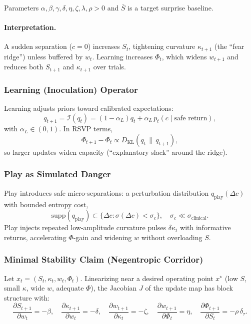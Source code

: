 \documentclass{article}
\theoremstyle{definition}
\begin{document}
Parameters $\alpha,\beta,\gamma,\delta,\eta,\zeta,\lambda,\rho > 0$ and $\bar S$ is a target surprise baseline.

\paragraph{Interpretation.} A sudden separation ($c=0$) increases $S_t$, tightening curvature $\kappa_{t+1}$ (the ``fear ridge'') unless buffered by $w_t$. Learning increases $\Phi_t$, which widens $w_{t+1}$ and reduces both $S_{t+1}$ and $\kappa_{t+1}$ over trials.

\subsubsection{Learning (Inoculation) Operator}

Learning adjusts priors toward calibrated expectations:
\[
q_{t+1} = \mathcal{I}(q_t) = (1-\alpha_L) q_t + \alpha_L \, p_t(c \mid \text{safe return}),
\]
with $\alpha_L \in (0,1)$. In RSVP terms,
\[
\Phi_{t+1} - \Phi_t \propto D_{\mathrm{KL}}(q_t \,\|\, q_{t+1}),
\]
so larger updates widen capacity (``explanatory slack'' around the ridge).

\subsubsection{Play as Simulated Danger}

Play introduces safe micro-separations: a perturbation distribution $q_{\mathrm{play}}(\Delta c)$ with bounded entropy cost,
\[
\mathrm{supp}(q_{\mathrm{play}}) \subset \{\Delta c : \sigma(\Delta c) < \sigma_c\}, \quad \sigma_c \ll \sigma_{\mathrm{clinical}}.
\]
Play injects repeated low-amplitude curvature pulses $\delta \kappa_t$ with informative returns, accelerating $\Phi$-gain and widening $w$ without overloading $S$.

\subsubsection{Minimal Stability Claim (Negentropic Corridor)}

Let $x_t = (S_t, \kappa_t, w_t, \Phi_t)$. Linearizing near a desired operating point $x^\star$ (low $S$, small $\kappa$, wide $w$, adequate $\Phi$), the Jacobian $J$ of the update map has block structure with:
\[
\frac{\partial S_{t+1}}{\partial w_t} = -\beta, \quad
\frac{\partial \kappa_{t+1}}{\partial w_t} = -\delta, \quad
\frac{\partial w_{t+1}}{\partial \kappa_t} = -\zeta, \quad
\frac{\partial w_{t+1}}{\partial \Phi_t} = \eta, \quad
\frac{\partial \Phi_{t+1}}{\partial S_t} = -\rho \, \delta_\tau.
\]
\end{document}
